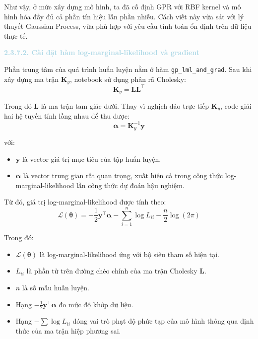 Như vậy, ở mức xây dựng mô hình, ta đã cố định GPR với RBF kernel và mô hình hóa đầy đủ cả phần tín hiệu lẫn phần nhiễu. Cách viết này vừa sát với lý thuyết Gaussian Process, vừa phù hợp với yêu cầu tính toán ổn định trên dữ liệu thực tế.

\noindent\textcolor{lightblue}{\textbf{2.3.7.2. Cài đặt hàm log-marginal-likelihood và gradient}}

Phần trung tâm của quá trình huấn luyện nằm ở hàm \texttt{gp\_lml\_and\_grad}. Sau khi xây dựng ma trận $\mathbf{K}_y$, notebook sử dụng phân rã Cholesky:
\begin{equation}
    \mathbf{K}_y = \mathbf{L}\mathbf{L}^{\top}
\end{equation}

Trong đó $\mathbf{L}$ là ma trận tam giác dưới. Thay vì nghịch đảo trực tiếp $\mathbf{K}_y$, code giải hai hệ tuyến tính lồng nhau để thu được:
\begin{equation}
    \boldsymbol{\alpha} = \mathbf{K}_y^{-1}\mathbf{y}
\end{equation}

với:
\begin{itemize}
    \item $\mathbf{y}$ là vector giá trị mục tiêu của tập huấn luyện.
    \item $\boldsymbol{\alpha}$ là vector trung gian rất quan trọng, xuất hiện cả trong công thức log-marginal-likelihood lẫn công thức dự đoán hậu nghiệm.
\end{itemize}

Từ đó, giá trị log-marginal-likelihood được tính theo:
\begin{equation}
    \mathcal{L}(\boldsymbol{\theta}) = -\frac{1}{2}\mathbf{y}^{\top}\boldsymbol{\alpha}
    - \sum_{i=1}^{n}\log L_{ii}
    - \frac{n}{2}\log(2\pi)
\end{equation}

Trong đó:
\begin{itemize}
    \item $\mathcal{L}(\boldsymbol{\theta})$ là log-marginal-likelihood ứng với bộ siêu tham số hiện tại.
    \item $L_{ii}$ là phần tử trên đường chéo chính của ma trận Cholesky $\mathbf{L}$.
    \item $n$ là số mẫu huấn luyện.
    \item Hạng $-\tfrac{1}{2}\mathbf{y}^{\top}\boldsymbol{\alpha}$ đo mức độ khớp dữ liệu.
    \item Hạng $-\sum \log L_{ii}$ đóng vai trò phạt độ phức tạp của mô hình thông qua định thức của ma trận hiệp phương sai.
\end{itemize}

